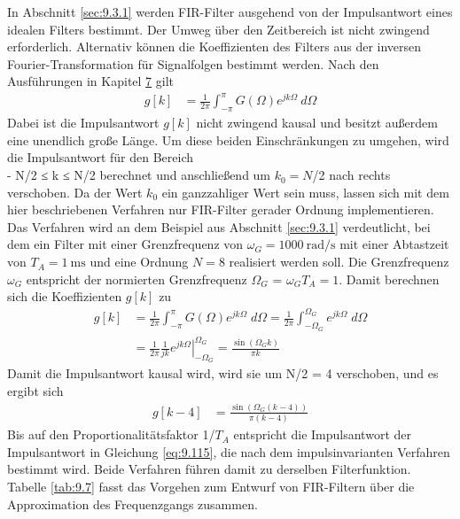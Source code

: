 In Abschnitt \ref{sec:9.3.1} werden FIR-Filter ausgehend von der Impulsantwort eines idealen Filters bestimmt. Der Umweg über den Zeitbereich ist nicht zwingend erforderlich. Alternativ können die Koeffizienten des Filters aus der inversen Fourier-Transformation für Signalfolgen bestimmt werden. Nach den Ausführungen in Kapitel \hyperref[spektrum-von-signalfolgen]{7} gilt
\begin{align}
g[ k] &= \frac{1}{2  \pi}  \int_{- \pi}^{\pi}{G(\Omega)  e^{j  k  \Omega}\ d\Omega} \label{eq:9.121}
\end{align}
Dabei ist die Impulsantwort \(g[k]\) nicht zwingend kausal und besitzt außerdem eine unendlich große Länge. Um diese beiden Einschränkungen zu umgehen, wird die Impulsantwort für den Bereich\\
- N/2 ≤ k ≤ N/2 berechnet und anschließend um \(k_{0} = N\)/2 nach rechts verschoben. Da der Wert \(k_{0}\) ein ganzzahliger Wert sein muss, lassen sich mit dem hier beschriebenen Verfahren nur FIR-Filter gerader Ordnung implementieren. Das Verfahren wird an dem Beispiel aus Abschnitt \ref{sec:9.3.1} verdeutlicht, bei dem ein Filter mit einer Grenzfrequenz von \(ω_{G} = \qty{1000}{\radian\per\second}\) mit einer Abtastzeit von \(T_{A} = \qty{1}{\milli\second}\) und eine Ordnung \(N = 8\) realisiert werden soll. Die Grenzfrequenz \(ω_{G}\) entspricht der normierten Grenzfrequenz \(Ω_{G}\) = \(ω_{G}\)\(T_{A} = 1\). Damit berechnen sich die Koeffizienten \(g[k]\) zu
\begin{align}
{g\left[k\right]} &=  {\frac{1}{2 \pi }  \int _{-\pi }^{\pi }G\left(\Omega \right) e^{j k \Omega } {\; }d\Omega  =\frac{1}{2 \pi }  \int _{-\Omega _{G} }^{\Omega _{G} }e^{j k \Omega } {\; }d\Omega  } \\
{} &=  {\frac{1}{2 \pi }  \frac{1}{j k}  \left. e^{j k \Omega } \right|_{-\Omega _{G} }^{\Omega _{G} } =\frac{\sin \left(\Omega _{G}  k\right)}{\pi  k} }
\label{eq:9.122}
\end{align}
Damit die Impulsantwort kausal wird, wird sie um N/2 = 4 verschoben, und es ergibt sich
\begin{align}
g[ k - 4] &= \frac{\sin\left( \Omega_{G}  (k - 4) \right)}{\pi  (k - 4)} \label{eq:9.123}
\end{align}
Bis auf den Proportionalitätsfaktor 1/\(T_{A}\) entspricht die Impulsantwort der Impulsantwort in Gleichung \eqref{eq:9.115}, die nach dem impulsinvarianten Verfahren bestimmt wird. Beide Verfahren führen damit zu derselben Filterfunktion. Tabelle \ref{tab:9.7} fasst das Vorgehen zum Entwurf von FIR-Filtern über die Approximation des Frequenzgangs zusammen.

